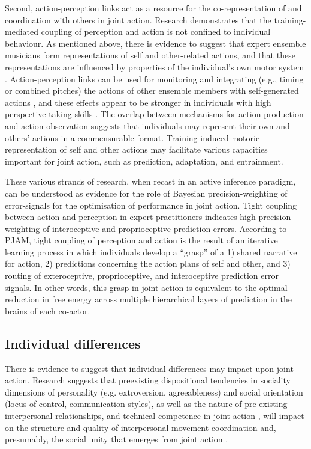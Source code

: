 \begin{CJK}{UTF8}{gbsn}
Second, action-perception links act as a resource for the co-representation of and coordination with others in joint action.
Research demonstrates that the training-mediated coupling of perception and action is not confined to individual behaviour.  As mentioned above, there is evidence to suggest that expert ensemble musicians form representations of self and other-related actions, and that these representations are influenced by properties of the individual’s own motor system \citep{Novembre2012}.  Action-perception links can be used for monitoring and integrating (e.g., timing or combined pitches) the actions of other ensemble members with self-generated actions \citep{Loehr2013}, and these effects appear to be stronger in individuals with high perspective taking skills \citep{Novembre2012,Loehr2013}.  The overlap between mechanisms for action production and action observation suggests that individuals may represent their own and others’ actions in a commensurable format.  Training-induced motoric representation of self and other actions may facilitate various capacities important for joint action, such as prediction, adaptation, and entrainment.

These various strands of research, when recast in an active inference paradigm, can be understood as evidence for the role of Bayesian precision-weighting of error-signals for the optimisation of performance in joint action.  Tight coupling between action and perception in expert practitioners indicates high precision weighting of interoceptive and proprioceptive prediction errors.   According to PJAM, tight coupling of perception and action is the result of an iterative learning process in which individuals develop a ``grasp'' of a 1) shared narrative for action, 2) predictions concerning the action plans of self and other, and 3) routing of exteroceptive, proprioceptive, and interoceptive prediction error signals.  In other words, this grasp in joint action is equivalent to the optimal reduction in free energy across multiple hierarchical layers of prediction in the brains of each co-actor.



\subsection{Individual differences}

There is evidence to suggest that individual differences may impact upon joint action.  Research suggests that preexisting dispositional tendencies in sociality dimensions of personality (e.g. extroversion, agreeableness) and social orientation (locus of control, communication styles), as well as the nature of pre-existing interpersonal relationships, and technical competence in joint action \citep{Novembre2014}, will impact on the structure and quality of interpersonal movement coordination and, presumably, the social unity that emerges from joint action \citep{Marsh2009}.


\end{CJK}
